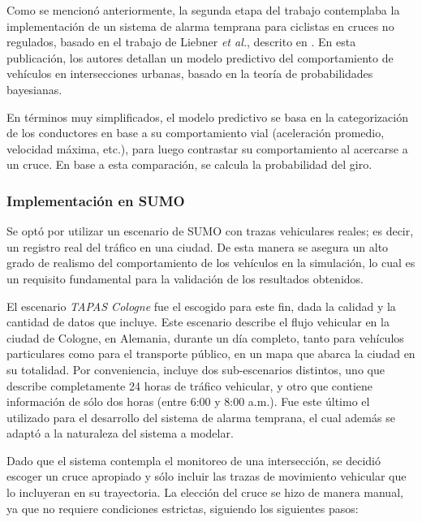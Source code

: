 \documentclass[11pt,letterpaper]{article}
\begin{document}
Como se mencionó anteriormente, la segunda etapa del trabajo contemplaba la implementación de un sistema de alarma temprana para ciclistas en cruces no regulados, basado en el trabajo de Liebner \emph{et al.}, descrito en \cite{prediction-paper}. En esta publicación, los autores detallan un modelo predictivo del comportamiento de vehículos en intersecciones urbanas, basado en la teoría de probabilidades bayesianas.

En términos muy simplificados, el modelo predictivo se basa en la categorización de los conductores en base a su comportamiento vial (aceleración promedio, velocidad máxima, etc.), para luego contrastar su comportamiento al acercarse a un cruce. En base a esta comparación, se calcula la probabilidad del giro.

\subsubsection{Implementación en SUMO}

Se optó por utilizar un escenario de SUMO con trazas vehiculares reales; es decir, un registro real del tráfico en una ciudad. De esta manera se asegura un alto grado de realismo del comportamiento de los vehículos en la simulación, lo cual es un requisito fundamental para la validación de los resultados obtenidos.

El escenario \emph{TAPAS Cologne} \cite{tapascologne} fue el escogido para este fin, dada la calidad y la cantidad de datos que incluye. Este escenario describe el flujo vehicular en la ciudad de Cologne, en Alemania, durante un día completo, tanto para vehículos particulares como para el transporte público, en un mapa que abarca la ciudad en su totalidad. Por conveniencia, incluye dos sub-escenarios distintos, uno que describe completamente 24 horas de tráfico vehicular, y otro que contiene información de sólo dos horas (entre 6:00 y 8:00 a.m.). Fue este último el utilizado para el desarrollo del sistema de alarma temprana, el cual además se adaptó a la naturaleza del sistema a modelar.

Dado que el sistema contempla el monitoreo de una intersección, se decidió escoger un cruce apropiado y sólo incluir las trazas de movimiento vehicular que lo incluyeran en su trayectoria. La elección del cruce se hizo de manera manual, ya que no requiere condiciones estrictas, siguiendo los siguientes pasos:
\end{document}
